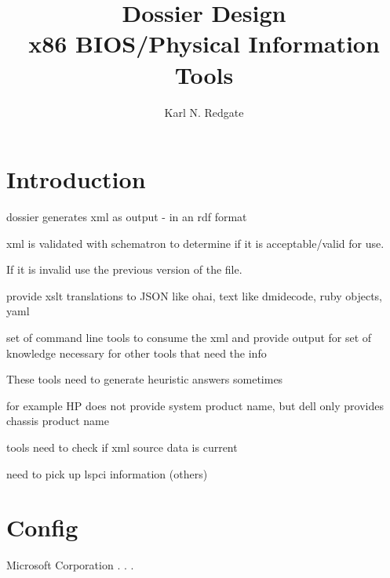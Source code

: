 \documentclass[twoside]{article}
\title{Dossier Design\\
x86 BIOS/Physical Information Tools}
\author{Karl N. Redgate}
\begin{document}
\maketitle

\begin{abstract}
\end{abstract}


\section{Introduction}

dossier generates xml as output - in an rdf format

xml is validated with schematron to determine if it is
acceptable/valid for use.

If it is invalid use the previous version of the file.

provide xslt translations to JSON like ohai,
text like dmidecode, ruby objects, yaml

set of command line tools to consume the xml and provide
output for set of knowledge necessary for other tools
that need the info

These tools need to generate heuristic answers sometimes

for example HP does not provide system product name, but
dell only provides chassis product name

tools need to check if xml source data is current

need to pick up lspci information (others)


\section{Config}




\begin{thebibliography}{99}

   Microsoft Corporation
   .
   .
   .

% 

\end{thebibliography}
\end{document}
